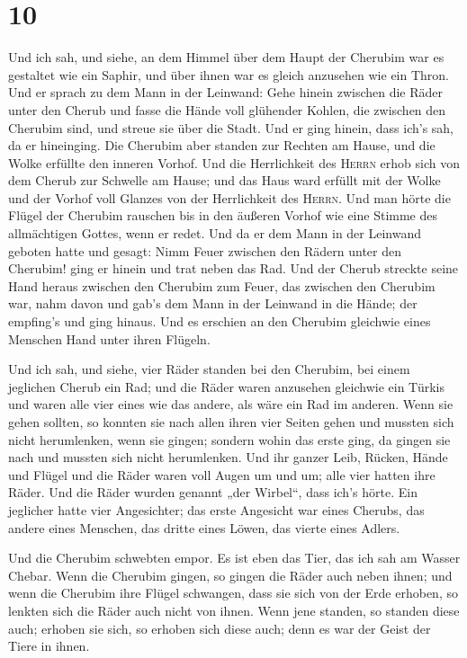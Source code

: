 \hypertarget{section-9}{%
\section{10}\label{section-9}}

 Und ich sah, und siehe, an dem Himmel über dem Haupt der
Cherubim war es gestaltet wie ein Saphir, und über ihnen war es gleich
anzusehen wie ein Thron.  Und er sprach zu dem Mann in der
Leinwand: Gehe hinein zwischen die Räder unter den Cherub und fasse die
Hände voll glühender Kohlen, die zwischen den Cherubim sind, und streue
sie über die Stadt. Und er ging hinein, dass ich's sah, da er
hineinging.  Die Cherubim aber standen zur Rechten am
Hause, und die Wolke erfüllte den inneren Vorhof.  Und die
Herrlichkeit des \textsc{Herrn} erhob sich von dem Cherub zur Schwelle
am Hause; und das Haus ward erfüllt mit der Wolke und der Vorhof voll
Glanzes von der Herrlichkeit des \textsc{Herrn}.  Und man
hörte die Flügel der Cherubim rauschen bis in den äußeren Vorhof wie
eine Stimme des allmächtigen Gottes, wenn er redet.  Und
da er dem Mann in der Leinwand geboten hatte und gesagt: Nimm Feuer
zwischen den Rädern unter den Cherubim! ging er hinein und trat neben
das Rad.  Und der Cherub streckte seine Hand heraus
zwischen den Cherubim zum Feuer, das zwischen den Cherubim war, nahm
davon und gab's dem Mann in der Leinwand in die Hände; der empfing's und
ging hinaus.  Und es erschien an den Cherubim gleichwie
eines Menschen Hand unter ihren Flügeln.

 Und ich sah, und siehe, vier Räder standen bei den
Cherubim, bei einem jeglichen Cherub ein Rad; und die Räder waren
anzusehen gleichwie ein Türkis  und waren alle vier eines
wie das andere, als wäre ein Rad im anderen.  Wenn sie
gehen sollten, so konnten sie nach allen ihren vier Seiten gehen und
mussten sich nicht herumlenken, wenn sie gingen; sondern wohin das erste
ging, da gingen sie nach und mussten sich nicht herumlenken.
 Und ihr ganzer Leib, Rücken, Hände und Flügel und die
Räder waren voll Augen um und um; alle vier hatten ihre Räder.
 Und die Räder wurden genannt „der Wirbel``, dass ich's
hörte.  Ein jeglicher hatte vier Angesichter; das erste
Angesicht war eines Cherubs, das andere eines Menschen, das dritte eines
Löwen, das vierte eines Adlers.

 Und die Cherubim schwebten empor. Es ist eben das Tier,
das ich sah am Wasser Chebar.  Wenn die Cherubim gingen,
so gingen die Räder auch neben ihnen; und wenn die Cherubim ihre Flügel
schwangen, dass sie sich von der Erde erhoben, so lenkten sich die Räder
auch nicht von ihnen.  Wenn jene standen, so standen
diese auch; erhoben sie sich, so erhoben sich diese auch; denn es war
der Geist der Tiere in ihnen.

